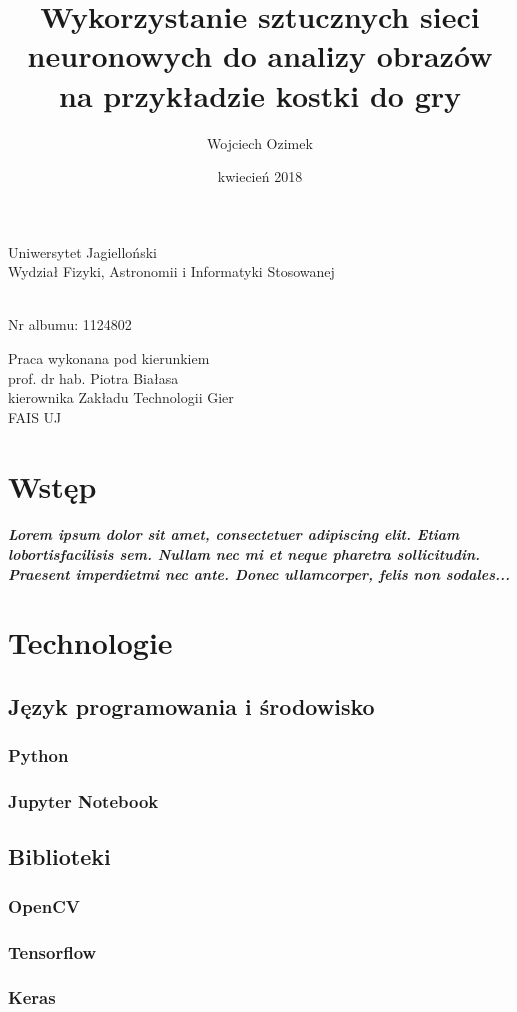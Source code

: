 \documentclass[a4paper,oneside]{report}
\author{Wojciech Ozimek}
\title{Wykorzystanie sztucznych sieci neuronowych do analizy obrazów na przykładzie kostki do gry}
\date{kwiecień 2018}
\makeatletter
\renewcommand{\maketitle}{\begin{titlepage}
	
	\vspace*{ \stretch{1} }
	\begin{center} \LARGE
	Uniwersytet Jagielloński \\
  	Wydział Fizyki, Astronomii i Informatyki Stosowanej
	\end{center}
	
	\vspace{ \stretch{1} }
	\begin{center} \Huge 
		\textsc {\@title}
	\end{center}
			
	\vspace{ \stretch{1} }
	\begin{center}
		\Large \@author \\
		\vspace{3mm}
		\large Nr albumu: 1124802
	\end{center}
	
	\vspace{ \stretch{1.5} }
	\begin{flushright}
	\begin{minipage}{8cm}
	\begin{center} \Large
	Praca wykonana pod kierunkiem \\
	prof. dr hab. Piotra Białasa \\
	kierownika Zakładu Technologii Gier \\
	FAIS UJ
	\end{center}
	\end{minipage}
	\end{flushright}
	\vspace{ \stretch{1} }
	\begin{center}
	\@date
	\end{center}
\end{titlepage}
}
\makeatother
\begin{document}
\maketitle{}

\tableofcontents
\newpage


\chapter {Wstęp}

\paragraph {Lorem  ipsum  dolor  sit  amet,  consectetuer  adipiscing  
elit.   Etiam  lobortisfacilisis sem.  Nullam nec mi et 
neque pharetra sollicitudin.  Praesent imperdietmi nec ante. 
Donec ullamcorper, felis non sodales...}


\chapter {Technologie}

\section {Język programowania i środowisko}

\subsection {Python}

\subsection {Jupyter Notebook}

\section {Biblioteki}

\subsection {OpenCV}

\subsection {Tensorflow}

\subsection {Keras}
\end{document}
